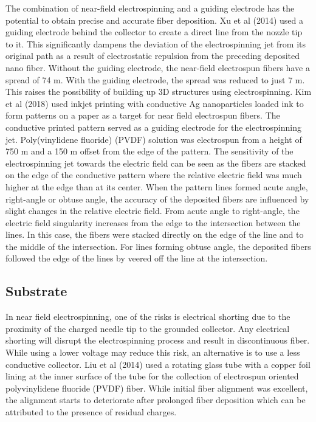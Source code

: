 \documentclass[3p,,preprint,12pt]{elsarticle}
\begin{document}
The combination of near-field electrospinning and a guiding electrode has the potential to obtain precise and accurate fiber deposition. Xu et al (2014) used a guiding electrode behind the collector to create a direct line from the nozzle tip to it. This significantly dampens the deviation of the electrospinning jet from its original path as a result of electrostatic repulsion from the preceding deposited nano fiber. Without the guiding electrode, the near-field electrospun fibers have a spread of 74 \textmu m. With the guiding electrode, the spread was reduced to just 7 \textmu m. This raises the possibility of building up 3D structures using electrospinning. Kim et al (2018) used inkjet printing with conductive Ag nanoparticles loaded ink to form patterns on a paper as a target for near field electrospun fibers. The conductive printed pattern served as a guiding electrode for the electrospinning jet. Poly(vinylidene fluoride) (PVDF) solution was electrospun from a height of 750 \textmu m and a 150 \textmu m offset from the edge of the pattern. The sensitivity of the electrospinning jet towards the electric field can be seen as the fibers are stacked on the edge of the conductive pattern where the relative electric field was much higher at the edge than at its center. When the pattern lines formed acute angle, right-angle or obtuse angle, the accuracy of the deposited fibers are influenced by slight changes in the relative electric field. From acute angle to right-angle, the electric field singularity increases from the edge to the intersection between the lines. In this case, the fibers were stacked directly on the edge of the line and to the middle of the intersection. For lines forming obtuse angle, the deposited fibers followed the edge of the lines by veered off the line at the intersection.



\subsection{Substrate}In near field electrospinning, one of the risks is electrical shorting due to the proximity of the charged needle tip to the grounded collector. Any electrical shorting will disrupt the electrospinning process and result in discontinuous fiber. While using a lower voltage may reduce this risk, an alternative is to use a less conductive collector. Liu et al (2014) used a rotating glass tube with a copper foil lining at the inner surface of the tube for the collection of electrospun oriented polyvinylidene fluoride (PVDF) fiber. While initial fiber alignment was excellent, the alignment starts to deteriorate after prolonged fiber deposition which can be attributed to the presence of residual charges.
\end{document}

